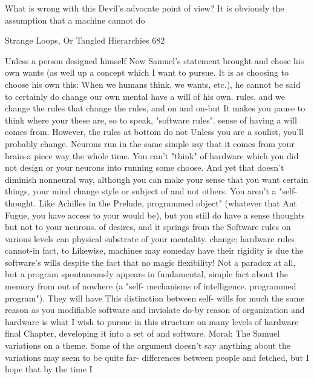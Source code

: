 What is wrong with this Devil's advocate
point of view? It is obviously the
assumption that a machine cannot do

Strange Loops, Or Tangled Hierarchies                                              682

  Unless a person designed himself                  Now Samuel's statement brought
  and chose his own wants (as well          up a concept which I want to pursue. It is
  as choosing to choose his own             this: When we humans think, we
  wants, etc.), he cannot be said to        certainly do change our own mental
  have a will of his own.                   rules, and we change the rules that
                                            change the rules, and on and on-but
It makes you pause to think where your      these are, so to speak, "software rules".
sense of having a will comes from.          However, the rules at bottom do not
Unless you are a soulist, you'll probably   change. Neurons run in the same simple
say that it comes from your brain-a piece   way the whole time. You can't "think"
of hardware which you did not design or     your neurons into running some
choose. And yet that doesn't diminish       nonneural way, although you can make
your sense that you want certain things,    your mind change style or subject of
and not others. You aren't a "self-         thought. Like Achilles in the Prelude,
programmed object" (whatever that           Ant Fugue, you have access to your
would be), but you still do have a sense    thoughts but not to your neurons.
of desires, and it springs from the         Software rules on various levels can
physical substrate of your mentality.       change; hardware rules cannot-in fact, to
Likewise, machines may someday have         their rigidity is due the software's
wills despite the fact that no magic        flexibility! Not a paradox at all, but a
program spontaneously appears in            fundamental, simple fact about the
memory from out of nowhere (a "self-        mechanisms of intelligence.
programmed program"). They will have                This distinction between self-
wills for much the same reason as you       modifiable software and inviolate
do-by reason of organization and            hardware is what I wish to pursue in this
structure on many levels of hardware        final Chapter, developing it into a set of
and software. Moral: The Samuel             variations on a theme. Some of the
argument doesn't say anything about the     variations may seem to be quite far-
differences    between     people     and   fetched, but I hope that by the time I
